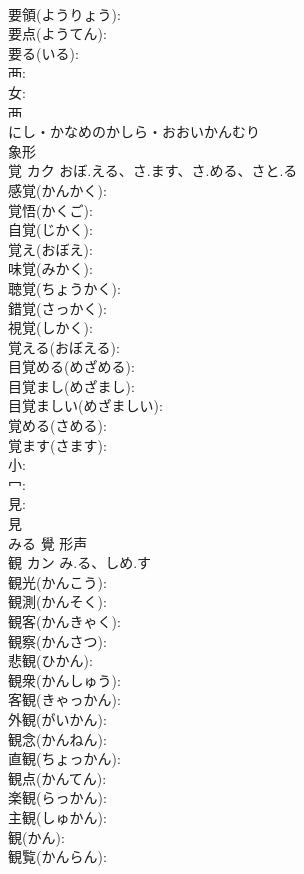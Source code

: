 \documentclass[8pt]{extreport}
\begin{document}
\begin{CJK}{UTF8}{min}
\\	要領(ようりょう): 
\\	要点(ようてん): 
\\	要る(いる): 
\\	襾: 
\\	女: 
\\	襾	
\\	にし・かなめのかしら・おおいかんむり	
\\	象形 
\\	覚	カク	おぼ.える、さ.ます、さ.める、さと.る		
\\	感覚(かんかく): 
\\	覚悟(かくご): 
\\	自覚(じかく): 
\\	覚え(おぼえ): 
\\	味覚(みかく): 
\\	聴覚(ちょうかく): 
\\	錯覚(さっかく): 
\\	視覚(しかく): 
\\	覚える(おぼえる): 
\\	目覚める(めざめる): 
\\	目覚まし(めざまし): 
\\	目覚ましい(めざましい): 
\\	覚める(さめる): 
\\	覚ます(さます): 
\\	小: 
\\	冖: 
\\	見: 
\\	見	
\\	みる	覺	形声 
\\	観	カン	み.る、しめ.す		
\\	観光(かんこう): 
\\	観測(かんそく): 
\\	観客(かんきゃく): 
\\	観察(かんさつ): 
\\	悲観(ひかん): 
\\	観衆(かんしゅう): 
\\	客観(きゃっかん): 
\\	外観(がいかん): 
\\	観念(かんねん): 
\\	直観(ちょっかん): 
\\	観点(かんてん): 
\\	楽観(らっかん): 
\\	主観(しゅかん): 
\\	観(かん): 
\\	観覧(かんらん): 

\end{CJK}
\end{document}

